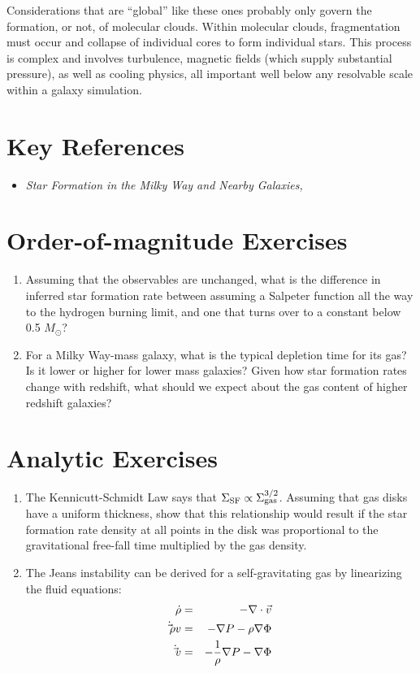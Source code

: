 Considerations that are ``global'' like these ones probably only
govern the formation, or not, of molecular clouds. Within molecular
clouds, fragmentation must occur and collapse of individual cores to
form individual stars. This process is complex and involves
turbulence, magnetic fields (which supply substantial pressure), as
well as cooling physics, all important well below any resolvable scale
within a galaxy simulation.

\section{Key References}

\begin{itemize}
  \item {\it Star Formation in the Milky Way and Nearby
  Galaxies, \href{https://ui.adsabs.harvard.edu/abs/2012ARA%26A..50..531K/abstract}{\citet{kennicutt12a}}}
\end{itemize}

\section{Order-of-magnitude Exercises}

\begin{enumerate} 
\item Assuming that the observables are unchanged, what is the
difference in inferred star formation rate between assuming a Salpeter
function all the way to the hydrogen burning limit, and one that turns
over to a constant below 0.5 $M_\odot$?
\item For a Milky Way-mass galaxy, what is the typical depletion time
for its gas? Is it lower or higher for lower mass galaxies? Given how
star formation rates change with redshift, what should we expect about
the gas content of higher redshift galaxies? 
\end{enumerate}   

\section{Analytic Exercises}

\begin{enumerate}
\item The Kennicutt-Schmidt Law says that $\Sigma_{\rm
SF} \propto \Sigma_{\rm gas}^{3/2}$. Assuming that gas disks have a
uniform thickness, show that this relationship would result if the
star formation rate density at all points in the disk was proportional
to the gravitational free-fall time multiplied by the gas density.
\item The Jeans instability can be derived for a self-gravitating gas
by linearizing the fluid equations:
\begin{eqnarray}
\dot\rho &=& - \nabla\cdot\vec{v} \cr
\dot\vec{\rho v} &=& - \nabla P - \rho \nabla\Phi \cr
\dot\vec{v} &=& - \frac{1}{\rho}\nabla P - \nabla\Phi \cr
\end{eqnarray}
\end{enumerate}


